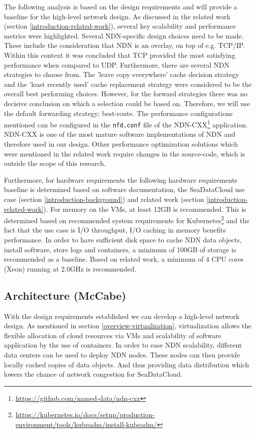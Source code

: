 The following analysis is based on the design requirements and will provide a baseline for the high-level network design. As discussed in the related work (section \ref{introduction-related-work}), several key scalability and performance metrics were highlighted. Several NDN-specific design choices need to be made. These include the consideration that NDN is an overlay, on top of e.g. TCP/IP. Within this context it was concluded that TCP provided the most satisfying performance when compared to UDP. Furthermore, there are several NDN strategies to choose from. The 'leave copy everywhere' cache decision strategy and the 'least recently used' cache replacement strategy were considered to be the overall best performing choices. However, for the forward strategies there was no decisive conclusion on which a selection could be based on. Therefore, we will use the default forwarding strategy; best-route. The performance configurations mentioned can be configured in the \texttt{nfd.conf} file of the NDN-CXX\footnote{\url{https://github.com/named-data/ndn-cxx}} application. NDN-CXX is one of the most mature software implementations of NDN and therefore used in our design. Other performance optimization solutions which were mentioned in the related work require changes in the source-code, which is outside the scope of this research.

Furthermore, for hardware requirements the following hardware requirements baseline is determined based on software documentation, the SeaDataCloud use case (section \ref{introduction-background}) and related work (section \ref{introduction-related-work}). For memory on the VMs, at least 12GB is recommended. This is determined based on recommended system requirements for Kubernetes\footnote{\url{https://kubernetes.io/docs/setup/production-environment/tools/kubeadm/install-kubeadm/}} and the fact that the use case is I/O throughput, I/O caching in memory benefits performance. In order to have sufficient disk space to cache NDN data objects, install software, store logs and containers, a minimum of 100GB of storage is recommended as a baseline. Based on related work, a minimum of 4 CPU cores (Xeon) running at 2.0GHz is recommended.

\subsection{Architecture (McCabe)}
\label{planning-architecture}
With the design requirements established we can develop a high-level network design. As mentioned in section \ref{overview-virtualization}, virtualization allows the flexible allocation of cloud resources via VMs and scalability of software application by the use of containers. In order to ease NDN scalability, different data centers can be used to deploy NDN nodes. These nodes can then provide locally cached copies of data objects. And thus providing data distribution which lowers the chance of network congestion for SeaDataCloud.

